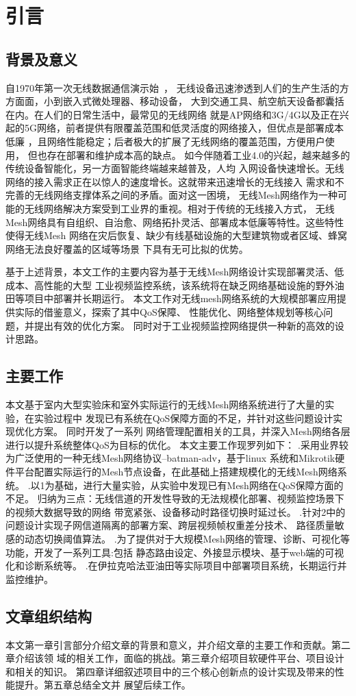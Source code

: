 \chapter{引言}
\label{cha:intro}

\section{背景及意义}
自1970年第一次无线数据通信演示始~\cite{IEEE80211}，
无线设备迅速渗透到人们的生产生活的方方面面，小到嵌入式微处理器、移动设备，
大到交通工具、航空航天设备都囊括在内。在人们的日常生活中，最常见的无线网络
就是AP网络和3G/4G以及正在兴起的5G网络，前者提供有限覆盖范围和低灵活度的网络接入，但优点是部署成本低廉
，且网络性能稳定；后者极大的扩展了无线网络的覆盖范围，方便用户使用，
但也存在部署和维护成本高的缺点。
如今伴随着工业4.0的兴起，越来越多的传统设备智能化，另一方面智能终端越来越普及，人均
入网设备快速增长。无线网络的接入需求正在以惊人的速度增长。这就带来迅速增长的无线接入
需求和不完善的无线网络支撑体系之间的矛盾。面对这一困境，
无线Mesh网络作为一种可能的无线网络解决方案受到工业界的重视。相对于传统的无线接入方式，
无线Mesh网络具有自组织、自治愈、网络拓扑灵活、部署成本低廉等特性。这些特性使得无线Mesh
网络在灾后恢复、缺少有线基础设施的大型建筑物或者区域、蜂窝网络无法良好覆盖的区域等场景
下具有无可比拟的优势。

基于上述背景，本文工作的主要内容为基于无线Mesh网络设计实现部署灵活、低成本、高性能的大型
工业视频监控系统，该系统将在缺乏网络基础设施的野外油田等项目中部署并长期运行。
本文工作对无线mesh网络系统的大规模部署应用提供实际的借鉴意义，探索了其中QoS保障、
性能优化、网络整体规划等核心问题，并提出有效的优化方案。
同时对于工业视频监控网络提供一种新的高效的设计思路。

\section{主要工作}
本文基于室内大型实验床和室外实际运行的无线Mesh网络系统进行了大量的实验，在实验过程中
发现已有系统在QoS保障方面的不足，并针对这些问题设计实现优化方案。
同时开发了一系列
网络管理配置相关的工具，并深入Mesh网络各层进行以提升系统整体QoS为目标的优化。
本文主要工作现罗列如下：
.采用业界较为广泛使用的一种无线Mesh网络协议--batman-adv，基于linux
系统和Mikrotik硬件平台配置实际运行的Mesh节点设备，在此基础上搭建规模化的无线Mesh网络系统。
.以1为基础，进行大量实验，从实验中发现已有Mesh网络在QoS保障方面的不足。
归纳为三点：无线信道的开发性导致的无法规模化部署、视频监控场景下的视频大数据导致的网络
带宽紧张、设备移动时路径切换时延过长。
.针对2中的问题设计实现子网信道隔离的部署方案、跨层视频帧权重差分技术、
路径质量敏感的动态切换阈值算法。
.为了提供对于大规模Mesh网络的管理、诊断、可视化等功能，开发了一系列工具:包括
静态路由设定、外接显示模块、基于web端的可视化和诊断系统等。
.在伊拉克哈法亚油田等实际项目中部署项目系统，长期运行并监控维护。

\section{文章组织结构}
本文第一章引言部分介绍文章的背景和意义，并介绍文章的主要工作和贡献。第二章介绍该领
域的相关工作，面临的挑战。第三章介绍项目软硬件平台、项目设计和相关的知识。
第四章详细叙述项目中的三个核心创新点的设计实现及带来的性能提升。第五章总结全文并
展望后续工作。


